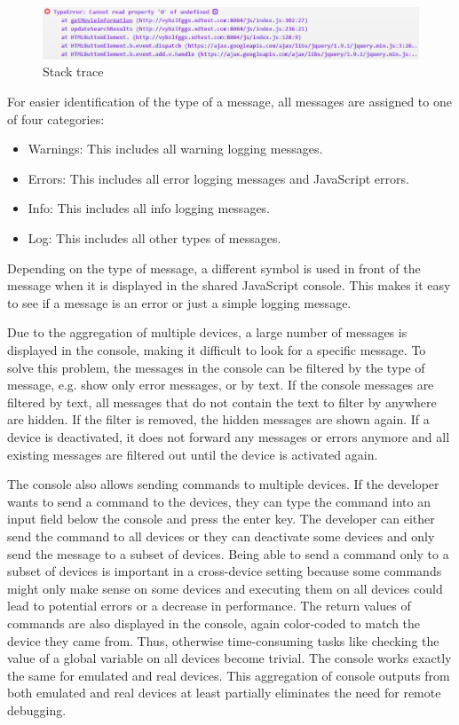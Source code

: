 \begin{figure}[H]
  \centering
    \includegraphics[width=1.0\textwidth]{images/screenshots/stack_trace_4.png}
	\caption[Screenshot: Stack trace]{Stack trace}
	\label{fig:stack_trace}
\end{figure}

For easier identification of the type of a message, all messages are assigned to one of four categories:
\begin{itemize}
	\item Warnings: This includes all warning logging messages.
	\item Errors: This includes all error logging messages and JavaScript errors.
	\item Info: This includes all info logging messages.
	\item Log: This includes all other types of messages.
\end{itemize}
Depending on the type of message, a different symbol is used in front of the message when it is displayed in the shared JavaScript console. This makes it easy to see if a message is an error or just a simple logging message.

Due to the aggregation of multiple devices, a large number of messages is displayed in the console, making it difficult to look for a specific message. To solve this problem, the messages in the console can be filtered by the type of message, e.g. show only error messages, or by text. If the console messages are filtered by text, all messages that do not contain the text to filter by anywhere are hidden. If the filter is removed, the hidden messages are shown again. If a device is deactivated, it does not forward any messages or errors anymore and all existing messages are filtered out until the device is activated again. 

The console also allows sending commands to multiple devices. If the developer wants to send a command to the devices, they can type the command into an input field below the console and press the enter key. The developer can either send the command to all devices or they can deactivate some devices and only send the message to a subset of devices. Being able to send a command only to a subset of devices is important in a cross-device setting because some commands might only make sense on some devices and executing them on all devices could lead to potential errors or a decrease in performance. The return values of commands are also displayed in the console, again color-coded to match the device they came from. Thus, otherwise time-consuming tasks like checking the value of a global variable on all devices become trivial. The console works exactly the same for emulated and real devices. This aggregation of console outputs from both emulated and real devices at least partially eliminates the need for remote debugging.

